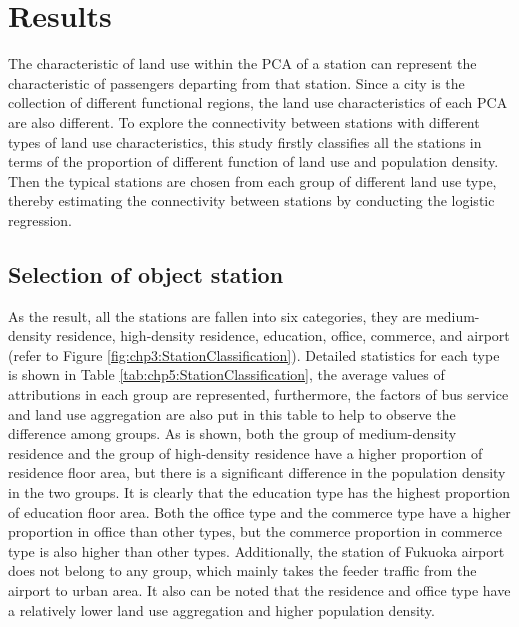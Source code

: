 \section{Results}
%
The characteristic of land use within the PCA of a station can represent the characteristic of passengers departing from that station. Since a city is the collection of different functional regions, the land use characteristics of each PCA are also different. To explore the connectivity between stations with different types of land use characteristics, this study firstly classifies all the stations in terms of the proportion of different function of land use and population density. Then the typical stations are chosen from each group of different land use type, thereby estimating the connectivity between stations by conducting the logistic regression. 

\subsection{Selection of object station}
%
As the result, all the stations are fallen into six categories, they are medium-density residence, high-density residence, education, office, commerce, and airport (refer to Figure \ref{fig:chp3:StationClassification}). Detailed statistics for each type is shown in Table \ref{tab:chp5:StationClassification}, the average values of attributions in each group are represented, furthermore, the factors of bus service and land use aggregation are also put in this table to help to observe the difference among groups. As is shown, both the group of medium-density residence and the group of high-density residence have a higher proportion of residence floor area, but there is a significant difference in the population density in the two groups. It is clearly that the education type has the highest proportion of education floor area. Both the office type and the commerce type have a higher proportion in office than other types, but the commerce proportion in commerce type is also higher than other types. Additionally, the station of Fukuoka airport does not belong to any group, which mainly takes the feeder traffic from the airport to urban area. It also can be noted that the residence and office type have a relatively lower land use aggregation and higher population density.

